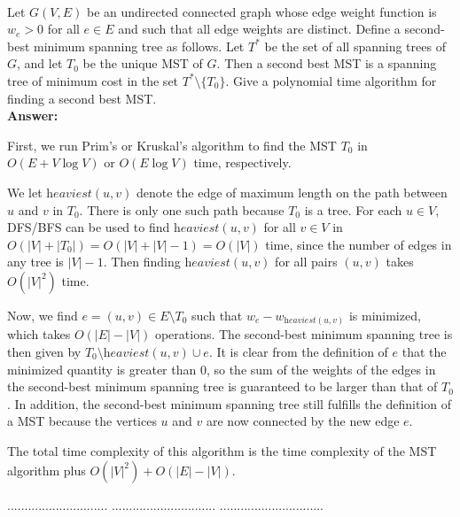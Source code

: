 \documentclass[a4paper,11pt]{article}
\begin{document}
\\
Let $G(V,E)$ be an undirected connected graph whose edge weight function is $w_e > 0$ for all $e \in E$
and such that all edge weights are distinct. 
Define  a second-best minimum spanning tree as follows. Let $T^*$ be the set of all spanning trees of $G$,
and let $T_0$ be the unique MST of $G$. 
Then a second best MST is a spanning tree of minimum cost in the set $T^*\setminus \{ T_0 \}$.
Give a polynomial time algorithm for finding a second best MST.\\
{\bf Answer:} \par
    First, we run Prim's or Kruskal's algorithm to find the MST $T_0$ in $O(E + V \log V)$ or $O(E \log V)$ time, respectively. \par
    We let $\textit{heaviest}(u, v)$ denote the edge of maximum length on the path between $u$ and $v$ in $T_0$. There is only one such path because $T_0$ is a tree. For each $u \in V$, DFS/BFS can be used to find $\textit{heaviest}(u, v)$ for all $v \in V$ in $O(|V| + |T_0|) = O(|V| + |V| - 1) = O(|V|)$ time, since the number of edges in any tree is $|V| - 1$. Then finding $\textit{heaviest}(u, v)$ for all pairs $(u, v)$ takes $O(|V|^2)$ time. \par
    Now, we find $e = (u, v) \in E \setminus T_0$ such that $w_e - w_{\textit{heaviest}(u, v)}$ is minimized, which takes $O(|E| - |V|)$ operations. The second-best minimum spanning tree is then given by $T_0 \setminus \textit{heaviest}(u, v) \cup e$. It is clear from the definition of $e$ that the minimized quantity is greater than $0$, so the sum of the weights of the edges in the second-best minimum spanning tree is guaranteed to be larger than that of $T_0$. In addition, the second-best minimum spanning tree still fulfills the definition of a MST because the vertices $u$ and $v$ are now connected by the new edge $e$. \par
    The total time complexity of this algorithm is the time complexity of the MST algorithm plus $O(|V|^2) + O(|E| - |V|)$.

\pagebreak

 $.............................$
 $..............................$
          $..............................$\\

\bigskip
\end{document}
